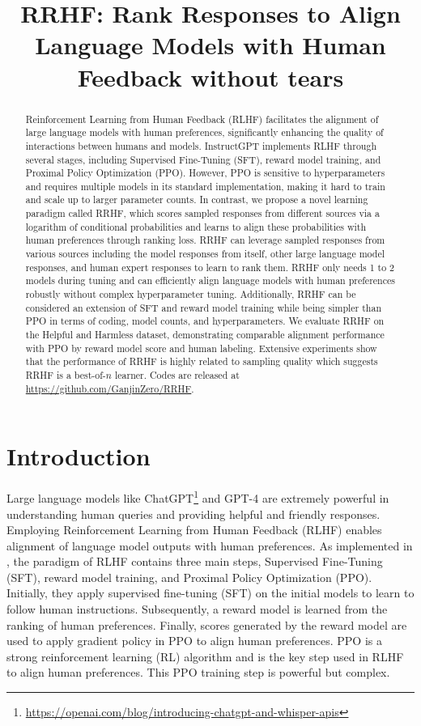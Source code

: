 \title{RRHF: Rank Responses to Align Language Models with Human Feedback without tears}

\begin{abstract}
Reinforcement Learning from Human Feedback (RLHF) facilitates the alignment of large language models with human preferences, significantly enhancing the quality of interactions between humans and models. InstructGPT implements RLHF through several stages, including Supervised Fine-Tuning (SFT), reward model training, and Proximal Policy Optimization (PPO). However, PPO is sensitive to hyperparameters and requires multiple models in its standard implementation, making it hard to train and scale up to larger parameter counts. In contrast, we propose a novel learning paradigm called RRHF, which scores sampled responses from different sources via a logarithm of conditional probabilities and learns to align these probabilities with human preferences through ranking loss. RRHF can leverage sampled responses from various sources including the model responses from itself, other large language model responses, and human expert responses to learn to rank them. RRHF only needs 1 to 2 models during tuning and can efficiently align language models with human preferences robustly without complex hyperparameter tuning. Additionally, RRHF can be considered an extension of SFT and reward model training while being simpler than PPO in terms of coding, model counts, and hyperparameters. We evaluate RRHF on the Helpful and Harmless dataset, demonstrating comparable alignment performance with PPO by reward model score and human labeling. Extensive experiments show that the performance of RRHF is highly related to sampling quality which suggests RRHF is a best-of-$n$ learner. Codes are released at \url{https://github.com/GanjinZero/RRHF}.
\end{abstract}

\section{Introduction}

Large language models like ChatGPT\footnote{\url{https://openai.com/blog/introducing-chatgpt-and-whisper-apis}} and GPT-4 \cite{gpt4} are extremely powerful in understanding human queries and providing helpful and friendly responses. Employing Reinforcement Learning from Human Feedback (RLHF) \cite{christiano2017deep,ziegler2019fine,stiennon2020learning} enables alignment of language model outputs with human preferences. As implemented in \citet{instructgpt}, the paradigm of RLHF contains three main steps,  Supervised Fine-Tuning (SFT), reward model training, and Proximal Policy Optimization (PPO). Initially, they apply supervised fine-tuning (SFT) on the initial models to learn to follow human instructions. Subsequently, a reward model is learned from the ranking of human preferences. Finally, scores generated by the reward model are used to apply gradient policy in PPO to align human preferences. PPO \cite{schulman2017proximal} is a strong reinforcement learning (RL) algorithm and is the key step used in RLHF \cite{instructgpt} to align human preferences. This PPO training step is powerful but complex. 

